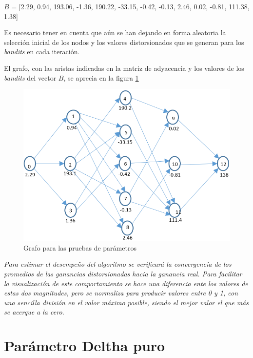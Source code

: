 
$B$ = [2.29, 0.94, 193.06, -1.36, 190.22, -33.15, -0.42, -0.13, 2.46, 0.02, -0.81, 111.38, 1.38]

Es necesario tener en cuenta que aún se han dejando en forma aleatoria la selección inicial de los nodos y los valores distorsionados que se generan para los \textit{bandits} en cada iteración.

El grafo, con las aristas indicadas en la matriz de adyacencia y los valores de los \textit{bandits} del vector $B$, se aprecia en la figura \ref{Grafocaso1}
\begin{figure}[H]
	\centering
	\includegraphics[scale=0.8]{Grafo5L.png}
	\caption{Grafo para las pruebas de parámetros}
	\label{Grafocaso1}
\end{figure}

\textit{Para estimar el desempeño del algoritmo se verificará la convergencia de los promedios de las ganancias distorsionadas hacia la ganancia real. Para facilitar la visualización de este comportamiento se hace una diferencia ente los valores de estas dos magnitudes, pero se normaliza para producir valores entre 0 y 1, con una sencilla división en el valor máximo posible, siendo el mejor valor el que más se acerque a la cero.}

\section{Parámetro Deltha puro}

